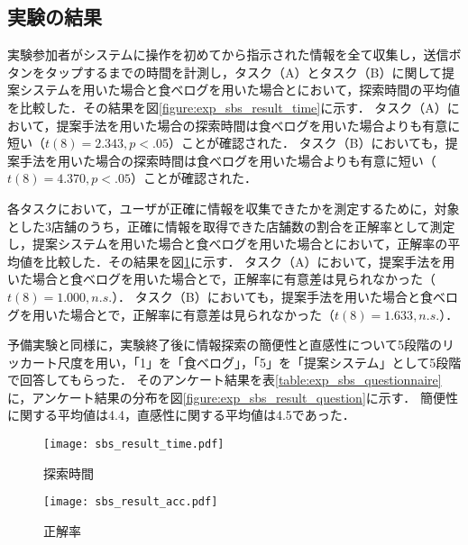   \subsection{実験の結果}
    実験参加者がシステムに操作を初めてから指示された情報を全て収集し，送信ボタンをタップするまでの時間を計測し，タスク（A）とタスク（B）に関して提案システムを用いた場合と食べログを用いた場合とにおいて，探索時間の平均値を比較した．その結果を図\ref{figure:exp_sbs_result_time}に示す．
    タスク（A）において，提案手法を用いた場合の探索時間は食べログを用いた場合よりも有意に短い（$t(8)=2.343, p<.05$）ことが確認された．
    タスク（B）においても，提案手法を用いた場合の探索時間は食べログを用いた場合よりも有意に短い（$t(8)=4.370, p<.05$）ことが確認された．

    各タスクにおいて，ユーザが正確に情報を収集できたかを測定するために，対象とした3店舗のうち，正確に情報を取得できた店舗数の割合を正解率として測定し，提案システムを用いた場合と食べログを用いた場合とにおいて，正解率の平均値を比較した．その結果を図\ref{figure:exp_sbs_result_acc}に示す．
    タスク（A）において，提案手法を用いた場合と食べログを用いた場合とで，正解率に有意差は見られなかった（$t(8)=1.000, n.s.$）．
    タスク（B）においても，提案手法を用いた場合と食べログを用いた場合とで，正解率に有意差は見られなかった（$t(8)=1.633, n.s.$）．

    予備実験と同様に，実験終了後に情報探索の簡便性と直感性について5段階のリッカート尺度を用い，「1」を「食べログ」，「5」を「提案システム」として5段階で回答してもらった．
    そのアンケート結果を表\ref{table:exp_sbs_questionnaire}に，アンケート結果の分布を図\ref{figure:exp_sbs_result_question}に示す．
    簡便性に関する平均値は4.4，直感性に関する平均値は4.5であった．

    \begin{figure}[tb]
      \begin{center}
        \texttt{[image: sbs\_result\_time.pdf]}
        \caption{探索時間}
        \label{figure:exp_sbs_result_time}
      \end{center}
      \vspace{1cm}
      \begin{center}
        \texttt{[image: sbs\_result\_acc.pdf]}
        \caption{正解率}
        \label{figure:exp_sbs_result_acc}
      \end{center}
    \end{figure}

